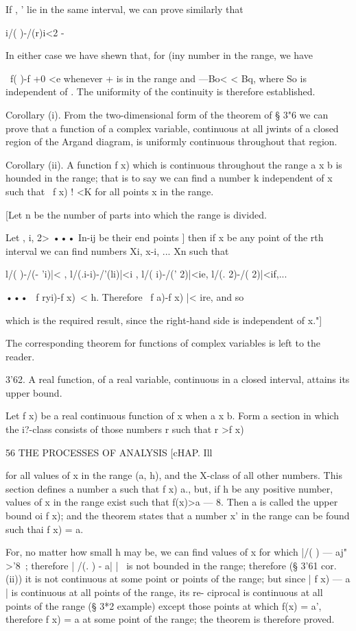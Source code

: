 If , ' lie in the same interval, we can prove similarly that

i/( )-/(r)i<2 -

In either case we have shewn that, for (iny number in the range, we
have

\ f( )-f +0 <e whenever + is in the range and —Bo< < Bq, where So is
independent of . The uniformity of the continuity is therefore
established.

Corollary (i). From the two-dimensional form of the theorem of § 3"6
we can prove that a function of a complex variable, continuous at all
jwints of a closed region of the Argand diagram, is uniformly
continuous throughout that region.

Corollary (ii). A function f x) which is continuous throughout the
range a x b is hounded in the range; that is to say we can find a
number k independent of x such that \ f x) ! <K for all points x in
the range.

[Let n be the number of parts into which the range is divided.

Let , i, 2> ••• In-ij be their end points ] then if x be any point of
the rth interval we can find numbers Xi, x-i, ... Xn such that

l/( )-/(- 'i)|< , l/(.i-i)-/'(li)|<i , l/( i)-/(' 2)|<ie, l/(. 2)-/(
2)|<if,...

••• \ f ryi)-f x)\ < h. Therefore \ f a)-f x) |< ire, and so

which is the required result, since the right-hand side is independent
of x."]

The corresponding theorem for functions of complex variables is left
to the reader.

3'62. A real function, of a real variable, continuous in a closed
interval, attains its upper bound.

Let f x) be a real continuous function of x when a x b. Form a section
in which the i?-class consists of those numbers r such that r >f x)



56 THE PROCESSES OF ANALYSIS [cHAP. Ill

for all values of x in the range (a, h), and the X-class of all other
numbers. This section defines a number a such that f x) a., but, if h
be any positive number, values of x in the range exist such that
f(x)>a — 8. Then a is called the upper bound oi f x); and the theorem
states that a number x' in the range can be found such thai f x) = a.

For, no matter how small h may be, we can find values of x for which
|/( ) — aj" >'8~; therefore | /(. ) - a| |~ is not bounded in the
range; therefore (§ 3'61 cor. (ii)) it is not continuous at some point
or points of the range; but since | f x) — a | is continuous at all
points of the range, its re- ciprocal is continuous at all points of
the range (§ 3*2 example) except those points at which f(x) = a',
therefore f x) = a at some point of the range; the theorem is
therefore proved.

